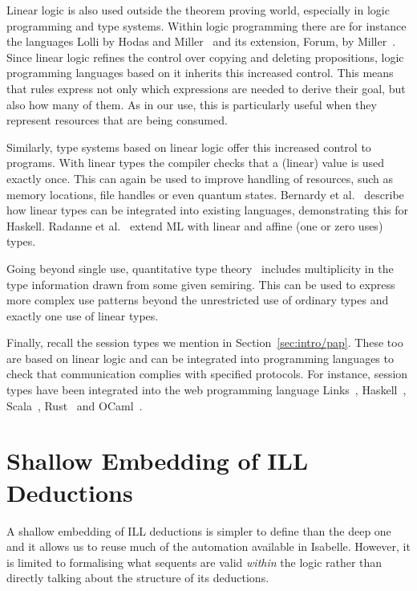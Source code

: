 \documentclass[class=smolathesis,crop=false]{standalone}
\begin{document}
\cbstart
Linear logic is also used outside the theorem proving world, especially in logic programming and type systems.
Within logic programming there are for instance the languages Lolli by Hodas and Miller~\cite{hodas_miller-1994} and its extension, Forum, by Miller~\cite{miller-1994}.
Since linear logic refines the control over copying and deleting propositions, logic programming languages based on it inherits this increased control.
This means that rules express not only which expressions are needed to derive their goal, but also how many of them.
As in our use, this is particularly useful when they represent resources that are being consumed.

Similarly, type systems based on linear logic offer this increased control to programs.
With linear types the compiler checks that a (linear) value is used exactly once.
This can again be used to improve handling of resources, such as memory locations, file handles or even quantum states.
Bernardy et al.~\cite{bernardy_et_al-2018} describe how linear types can be integrated into existing languages, demonstrating this for Haskell.
Radanne et al.~\cite{radanne_et_al-2020} extend ML with linear and affine (one or zero uses) types.

Going beyond single use, quantitative type theory~\cite{atkey-2018} includes multiplicity in the type information drawn from some given semiring.
This can be used to express more complex use patterns beyond the unrestricted use of ordinary types and exactly one use of linear types.

Finally, recall the session types we mention in Section~\ref{sec:intro/pap}.
These too are based on linear logic and can be integrated into programming languages to check that communication complies with specified protocols.
For instance, session types have been integrated into the web programming language Links~\cite{lindley_garrett-2017}, Haskell~\cite{lindley_garrett-2016,orchard_yoshida-2016,imai_et_al-2011,pucella_tov-2008}, Scala~\cite{scalas_yoshida-2016}, Rust~\cite{jespersen_et_al-2015} and OCaml~\cite{melgratti_padovani-2017}.
\cbend

\section{Shallow Embedding of ILL Deductions}
\label{sec:linearity/shallow}

A shallow embedding of ILL deductions is simpler to define than the deep one and it allows us to reuse much of the automation available in Isabelle.
However, it is limited to formalising what sequents are valid \emph{within} the logic rather than directly talking about the structure of its deductions.
\end{document}

